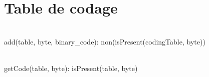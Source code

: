 \section{Table de codage}

\begin{algorithme}
    {}
    {

    }
    \\
    {add(table, byte, binary\_code): non(isPresent(codingTable, byte))}
    {}
    {

    }
    \\
    {getCode(table, byte): isPresent(table, byte)}
    {}
    {

    }
    \\
    {}
    {

    }
    \\
\end{algorithme}